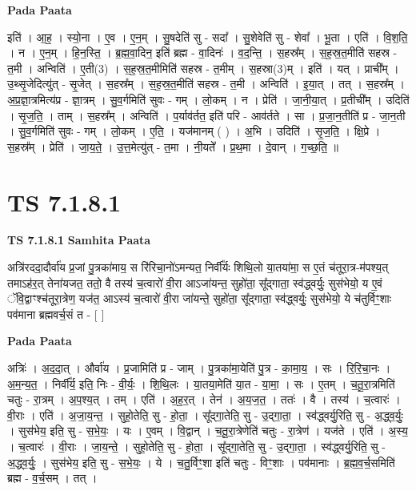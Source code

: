 \documentclass[17pt]{extarticle}
\begin{document}
\textbf{Pada Paata} \newline

इति॑ । आ॒ह॒ । स्यो॒ना । ए॒व । ए॒न॒म् । सु॒षदेति॑ सु - सदा᳚ । सु॒शेवेति॑ सु - शेवा᳚ । भू॒ता । एति॑ । वि॒श॒ति॒ । न । ए॒न॒म् । हि॒न॒स्ति॒ । ब्र॒ह्म॒वा॒दिन॒ इति॑ ब्रह्म - वा॒दिनः॑ । व॒द॒न्ति॒ । स॒हस्र᳚म् । स॒ह॒स्र॒त॒मीति॑ सहस्र - त॒मी । अन्विति॑ । ए॒ती(3) । स॒ह॒स्र॒त॒मीमिति॑ सहस्र - त॒मीम् । स॒हस्रा(3)म् । इति॑ । यत् । प्राची᳚म् । उ॒थ्सृ॒जेदित्यु॑त् - सृ॒जेत् । स॒हस्र᳚म् । स॒ह॒स्र॒त॒मीति॑ सहस्र - त॒मी । अन्विति॑ । इ॒या॒त् । तत् । स॒हस्र᳚म् । अ॒प्र॒ज्ञा॒त्रमित्य॑प्र - ज्ञा॒त्रम् । सु॒व॒र्गमिति॑ सुवः - गम् । लो॒कम् । न । प्रेति॑ । जा॒नी॒या॒त् । प्र॒तीची᳚म् । उदिति॑ । सृ॒ज॒ति॒ । ताम् । स॒हस्र᳚म् । अन्विति॑ । प॒र्याव॑र्तत॒ इति॑ परि - आव॑र्तते । सा । प्र॒जा॒न॒तीति॑ प्र - जा॒न॒ती । सु॒व॒र्गमिति॑ सुवः - गम् । लो॒कम् । ए॒ति॒ । यज॑मानम् ( ) । अ॒भि । उदिति॑ । सृ॒ज॒ति॒ । क्षि॒प्रे । स॒हस्र᳚म् । प्रेति॑ । जा॒य॒ते॒ । उ॒त्त॒मेत्यु॑त् - त॒मा । नी॒यते᳚ । प्र॒थ॒मा । दे॒वान् । ग॒च्छ॒ति॒ ॥  \newline




\section*{ TS 7.1.8.1 }

\textbf{TS 7.1.8.1 } \newline
\textbf{Samhita Paata} \newline

अत्रि॑रददा॒दौर्वा॑य प्र॒जां पु॒त्रका॑माय॒ स रि॑रिचा॒नो॑ऽमन्यत॒ निर्वी᳚र्यः शिथि॒लो या॒तया॑मा॒ स ए॒तं च॑तूरा॒त्र-म॑पश्य॒त् तमाऽह॑र॒त् तेना॑यजत॒ ततो॒ वै तस्य॑ च॒त्वारो॑ वी॒रा आऽजा॑यन्त॒ सुहो॑ता॒ सू᳚द्गाता॒ स्व॑द्ध्वर्युः॒ सुस॑भेयो॒ य ए॒वं ॅवि॒द्वाꣳश्च॑तूरा॒त्रेण॒ यज॑त॒ आऽस्य॑ च॒त्वारो॑ वी॒रा जा॑यन्ते॒ सुहो॑ता॒ सू᳚द्गाता॒ स्व॑द्ध्वर्युः॒ सुस॑भेयो॒ ये च॑तुर्विꣳ॒॒शाः पव॑माना ब्रह्मवर्च॒सं त - [  ] \newline

\textbf{Pada Paata} \newline

अत्रिः॑ । अ॒द॒दा॒त् । और्वा॑य । प्र॒जामिति॑ प्र - जाम् । पु॒त्रका॑मा॒येति॑ पु॒त्र - का॒मा॒य॒ । सः । रि॒रि॒चा॒नः । अ॒म॒न्य॒त॒ । निर्वी᳚र्य॒ इति॒ निः - वी॒र्यः॒ । शि॒थि॒लः । या॒तया॒मेति॑ या॒त - या॒मा॒ । सः । ए॒तम् । च॒तू॒रा॒त्रमिति॑ चतुः - रा॒त्रम् । अ॒प॒श्य॒त् । तम् । एति॑ । अ॒ह॒र॒त् । तेन॑ । अ॒य॒ज॒त॒ । ततः॑ । वै । तस्य॑ । च॒त्वारः॑ । वी॒राः । एति॑ । अ॒जा॒य॒न्त॒ । सुहो॒तेति॒ सु - हो॒ता॒ । सू᳚द्गा॒तेति॒ सु - उ॒द्गा॒ता॒ । स्व॑द्ध्वर्यु॒रिति॒ सु - अ॒द्ध्व॒र्युः॒ । सुस॑भेय॒ इति॒ सु - स॒भे॒यः॒ । यः । ए॒वम् । वि॒द्वान् । च॒तू॒रा॒त्रेणेति॑ चतुः - रा॒त्रेण॑ । यज॑ते । एति॑ । अ॒स्य॒ । च॒त्वारः॑ । वी॒राः । जा॒य॒न्ते॒ । सुहो॒तेति॒ सु - हो॒ता॒ । सू᳚द्गा॒तेति॒ सु - उ॒द्गा॒ता॒ । स्व॑द्ध्वर्यु॒रिति॒ सु - अ॒द्ध्व॒र्युः॒ । सुस॑भेय॒ इति॒ सु - स॒भे॒यः॒ । ये । च॒तु॒र्विꣳ॒॒शा इति॑ चतुः - विꣳ॒॒शाः । पव॑मानाः । ब्र॒ह्म॒व॒र्च॒समिति॑ ब्रह्म - व॒र्च॒सम् । तत् ।  \newline
\end{document}
